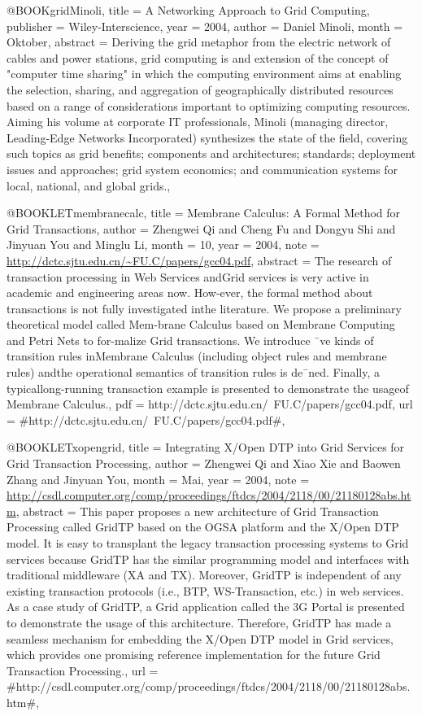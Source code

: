 @BOOK{gridMinoli,
  title = {{A Networking Approach to Grid Computing}},
  publisher = {Wiley-Interscience},
  year = {2004},
  author = {Daniel Minoli},
  month = {Oktober},
  abstract = {Deriving the grid metaphor from the
electric network of cables and
	power stations, grid computing is and
extension of the concept of
	"computer time sharing" in which the
computing environment aims at
	enabling the selection, sharing, and
aggregation of geographically
	distributed resources based on a range of
considerations important
	to optimizing computing resources. Aiming his
volume at corporate
	IT professionals, Minoli (managing director,
Leading-Edge Networks
	Incorporated) synthesizes the state of the field,
covering such topics
	as grid benefits; components and architectures;
standards; deployment
	issues and approaches; grid system economics;
and communication systems
	for local, national, and global grids.},
}

@BOOKLET{membranecalc,
  title = {{Membrane Calculus: A Formal Method for Grid Transactions}},
  author = {Zhengwei Qi and Cheng Fu and Dongyu Shi and Jinyuan You and Minglu
	Li},
  month = {10},
  year = {2004},
  note = {\url{http://dctc.sjtu.edu.cn/~FU.C/papers/gcc04.pdf}},
  abstract = {The research of transaction processing in Web Services andGrid services
	is very active in
academic and engineering areas now. How-ever, the
	formal method about
transactions is not fully investigated inthe
	literature. We propose a
preliminary theoretical model called Mem-brane
	Calculus based on
Membrane Computing and Petri Nets to for-malize
	Grid transactions. We
introduce ¯ve kinds of transition rules inMembrane
	Calculus (including
object rules and membrane rules) andthe operational
	semantics of
transition rules is de¯ned. Finally, a typicallong-running
	transaction
example is presented to demonstrate the usageof Membrane
	Calculus.},
  pdf = {http://dctc.sjtu.edu.cn/~FU.C/papers/gcc04.pdf},
  url = {#http://dctc.sjtu.edu.cn/~FU.C/papers/gcc04.pdf#},
}

@BOOKLET{xopengrid,
  title = {{Integrating X/Open DTP into Grid Services for Grid Transaction Processing}},
  author = {Zhengwei Qi and Xiao Xie and Baowen Zhang and Jinyuan You},
  month = {Mai},
  year = {2004},
  note = {\url{http://csdl.computer.org/comp/proceedings/ftdcs/2004/2118/00/21180128abs.htm}},
  abstract = {This paper proposes a new architecture of Grid Transaction Processing
	called GridTP
based on the OGSA platform and the X/Open DTP model.
	It is easy to
transplant the legacy transaction processing systems
	to Grid services
because GridTP has the similar programming model
	and interfaces with
traditional middleware (XA and TX). Moreover,
	GridTP is independent
of any existing transaction protocols (i.e.,
	BTP, WS-Transaction,
etc.) in web services. As a case study of GridTP,
	a Grid application
called the 3G Portal is presented to demonstrate
	the usage of this
architecture. Therefore, GridTP has made a seamless
	mechanism for embedding
the X/Open DTP model in Grid services, which
	provides one promising
reference implementation for the future Grid
	Transaction Processing.},
  url = {#http://csdl.computer.org/comp/proceedings/ftdcs/2004/2118/00/21180128abs.htm#},
}

